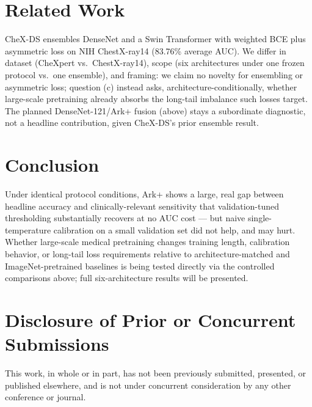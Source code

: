 \documentclass[11pt]{article}
\begin{document}
\section*{Related Work}

CheX-DS \cite{chexds2025} ensembles DenseNet and a Swin Transformer with weighted BCE plus asymmetric loss on NIH ChestX-ray14 (83.76\% average AUC). We differ in dataset (CheXpert vs.\ ChestX-ray14), scope (six architectures under one frozen protocol vs.\ one ensemble), and framing: we claim no novelty for ensembling or asymmetric loss; question (c) instead asks, architecture-conditionally, whether large-scale pretraining already absorbs the long-tail imbalance such losses target. The planned DenseNet-121/Ark+ fusion (above) stays a subordinate diagnostic, not a headline contribution, given CheX-DS's prior ensemble result.

\section*{Conclusion}

Under identical protocol conditions, Ark+ shows a large, real gap between headline accuracy and clinically-relevant sensitivity that validation-tuned thresholding substantially recovers at no AUC cost --- but naive single-temperature calibration on a small validation set did not help, and may hurt. Whether large-scale medical pretraining changes training length, calibration behavior, or long-tail loss requirements relative to architecture-matched and ImageNet-pretrained baselines is being tested directly via the controlled comparisons above; full six-architecture results will be presented.

\section*{Disclosure of Prior or Concurrent Submissions}

This work, in whole or in part, has not been previously submitted, presented, or published elsewhere, and is not under concurrent consideration by any other conference or journal.
\end{document}
